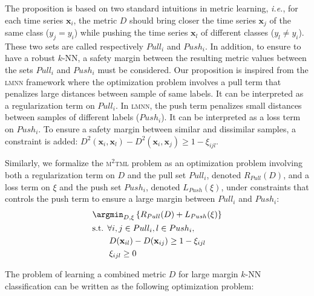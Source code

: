 The proposition is based on two standard intuitions in metric learning, \textit{i.e.}, for each time series $\textbf{x}_i$, the metric $D$ should bring closer the time series $\textbf{x}_j$ of the same class ($y_j=y_i$) while pushing the time series $\textbf{x}_l$ of different classes ($y_l \neq y_i$). These two sets are called respectively $Pull_i$ and $Push_i$. 
In addition, to ensure to have a robust $k$-NN, a safety margin between the resulting metric values between the sets $Pull_i$ and $Push_i$ must be considered. Our proposition is inspired from the \textsc{lmnn} framework where the optimization problem involves a pull term that penalizes large distances between sample of same labels. It can be interpreted as a regularization term on $Pull_i$. In \textsc{lmnn}, the push term penalizes small distances between samples of different labels ($Push_i$). It can be interpreted as a loss term on $Push_i$. To ensure a safety margin between similar and dissimilar samples, a constraint is added: $D^2(\textbf{x}_i,\textbf{x}_l)-D^2(\textbf{x}_i,\textbf{x}_j) \geq 1 - \xi_{ijl}$.

Similarly, we formalize the \textsc{m$^2$tml} problem as an optimization problem involving both a regularization term on $D$ and the pull set $Pull_i$, denoted $R_{Pull}(D)$, and a loss term on $\xi$ and the push set $Push_i$, denoted $L_{Push}(\xi)$, under constraints that controls the push term to ensure a large margin between $Pull_i$ and $Push_i$:
\begin{equation}
\begin{aligned}
\displaystyle 	& \argmin_{D,\xi} \left\lbrace R_{Pull}(D) + L_{Push}(\xi) \right\rbrace  \\
& \text{s.t. } 	\forall i, j \in Pull_i, l \in Push_i, \\
				& \qquad D(\textbf{x}_{il})-D(\textbf{x}_{ij}) \geq 1 - \xi_{ijl} \\
				& \qquad \xi_{ijl} \geq 0 
\end{aligned}
\end{equation}

\noindent The problem of learning a combined metric $D$ for large margin $k$-NN classification can be written as the following optimization problem:

